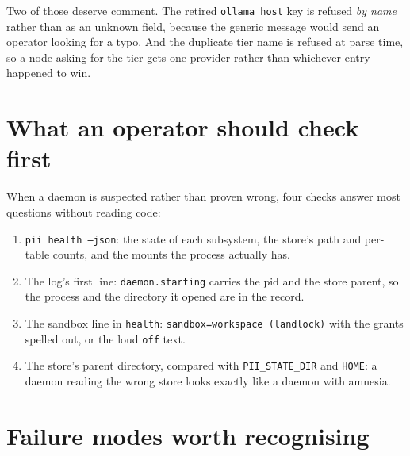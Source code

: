 Two of those deserve comment. The retired \texttt{ollama\_host} key is refused \emph{by name}
rather than as an unknown field, because the generic message would send an operator looking
for a typo. And the duplicate tier name is refused at parse time, so a node asking for the
tier gets one provider rather than whichever entry happened to win.

\section{What an operator should check first}

When a daemon is suspected rather than proven wrong, four checks answer most questions without
reading code:

\begin{enumerate}
	\item \texttt{pii health --json}: the state of each subsystem, the store's path and
	per-table counts, and the mounts the process actually has.
	\item The log's first line: \texttt{daemon.starting} carries the pid and the store parent,
	so the process and the directory it opened are in the record.
	\item The sandbox line in \texttt{health}: \texttt{sandbox=workspace (landlock)} with the
	grants spelled out, or the loud \texttt{off} text.
	\item The store's parent directory, compared with \texttt{PII\_STATE\_DIR} and
	\texttt{HOME}: a daemon reading the wrong store looks exactly like a daemon with amnesia.
\end{enumerate}

\section{Failure modes worth recognising}

